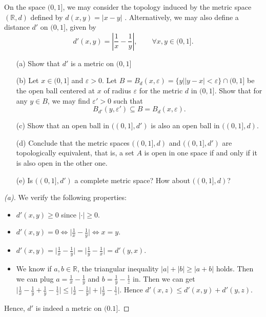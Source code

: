 \begin{problem}
    On the space $(0,1]$, we may consider the topology induced by the metric space $(\mathbb{R},d)$ defined by
$d(x,y)=|x-y|$ . Alternatively, we may also define a distance $d'$ on $(0,1]$, given by
\[
d'(x,y) = \left| \frac{1}{x} - \frac{1}{y} \right|, \qquad \forall x,y \in (0,1].
\]

\begin{enumerate}
 \item[(a)] Show that $d'$ is a metric on $(0,1]$
 \item[(b)] Let $x \in (0,1]$ and $\varepsilon>0$. Let $B = B_{d}(x,\varepsilon)=\{y | |y-x| < \varepsilon \} \cap (0,1]$  be the open ball centered at $x$ of radius $\varepsilon$ for the metric $d$ in $(0,1]$.  
  Show that for any $y \in B$, we may find $\varepsilon'>0$ such that
  \[
  B_{d'}(y,\varepsilon') \subseteq B = B_{d}(x,\varepsilon).
  \]

 \item[(c)]Show that an open ball in $((0,1],d')$ is also an open ball in $((0,1],d)$.

 \item[(d)] Conclude that the metric spaces $((0,1],d)$ and $((0,1],d')$ are topologically equivalent, that is, a set $A$ is open in one space if and only if it is also open in the other one.

 \item[(e)] Is $((0,1],d')$ a complete metric space? How about $((0,1],d)$?
\end{enumerate}
\end{problem}

\begin{proof}[(a)]
    We verify the following properties:
    \begin{itemize}
        \item $d'(x,y) \geq 0$ since $\lvert \cdot \rvert \geq 0$.
        \item $d'(x,y) = 0 \iff \lvert\frac{1}{x} - \frac{1}{y}\rvert \iff x=y$.
        \item $d'(x,y) = \lvert\frac{1}{x} - \frac{1}{y}\rvert = \lvert\frac{1}{y} - \frac{1}{x}\rvert = d'(y,x)$.
        \item We know if $a, b \in \mathbb{R}$, the triangular inequality $\lvert a \rvert + \lvert b \rvert \geq \lvert a+b \rvert$ holds.
        Then we can plug $a = \frac{1}{x} - \frac{1}{y}$ and $b = \frac{1}{y} - \frac{1}{z}$ in. Then we can get $\lvert \frac{1}{x} - \frac{1}{y} + \frac{1}{y} - \frac{1}{z} \rvert \leq \lvert \frac{1}{x} - \frac{1}{y} \rvert + \lvert \frac{1}{y} - \frac{1}{z} \rvert$. Hence $d'(x,z) \leq d'(x,y) + d'(y,z)$.
    \end{itemize}
    Hence, $d'$ is indeed a metric on $(0.1]$.
\end{proof}

